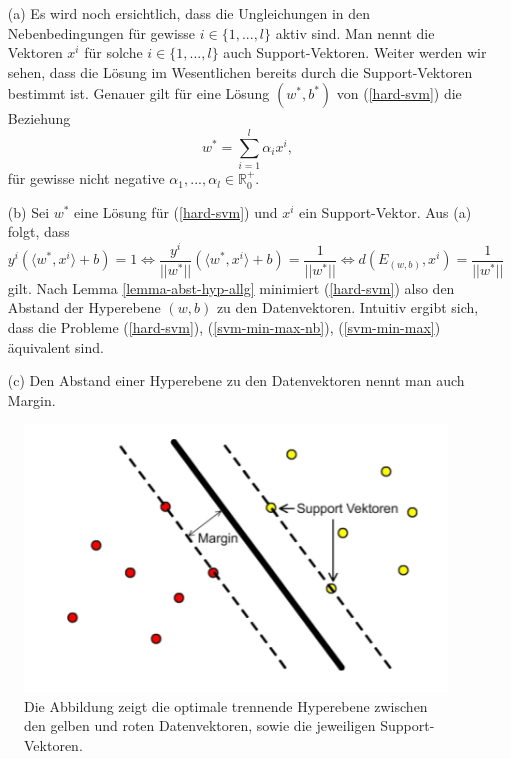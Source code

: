 \begin{bemerkung}
\label{bem-hard-svm}
\begin{itemize}
\item[(a)] Es wird noch ersichtlich, dass die Ungleichungen in den Nebenbedingungen für gewisse $i \in \{1,...,l\}$ aktiv sind. Man nennt die Vektoren $x^i$ für solche $i \in \{1,...,l\}$ auch Support-Vektoren. Weiter werden wir sehen, dass die Lösung im Wesentlichen bereits durch die Support-Vektoren bestimmt ist. Genauer gilt für eine Lösung $(w^*,b^*)$ von (\ref{hard-svm}) die Beziehung 
$$
w^* = \sum_{i=1}^{l} \alpha_i x^i,
$$ 
für gewisse nicht negative $\alpha_1,...,\alpha_l \in \mathbb{R}^+_0$. 
\item[(b)] Sei $w^*$ eine Lösung für (\ref{hard-svm}) und $x^i$ ein Support-Vektor. Aus (a) folgt, dass $$
y^i(\langle w^*, x^i \rangle + b) = 1 
\Leftrightarrow 
\frac{y^i}{||w^*||}(\langle w^*, x^i \rangle + b) = \frac{1}{||w^*||} \Leftrightarrow
d(E_{(w,b)},x^i) = \frac{1}{||w^*||}
$$
gilt. Nach Lemma \ref{lemma-abst-hyp-allg} minimiert (\ref{hard-svm}) also den Abstand der Hyperebene $(w,b)$ zu den Datenvektoren. Intuitiv ergibt sich, dass die Probleme (\ref{hard-svm}), (\ref{svm-min-max-nb}), (\ref{svm-min-max}) äquivalent sind.
\item[(c)] Den Abstand einer Hyperebene zu den Datenvektoren nennt man auch Margin.
\end{itemize}
\end{bemerkung}

\begin{figure}
	\centering
	\includegraphics{abbildungen/sv.PNG}
	\caption{Die Abbildung zeigt die optimale trennende Hyperebene zwischen den gelben und roten Datenvektoren, sowie die jeweiligen Support-Vektoren.}
	\label{img:sv}
\end{figure}

